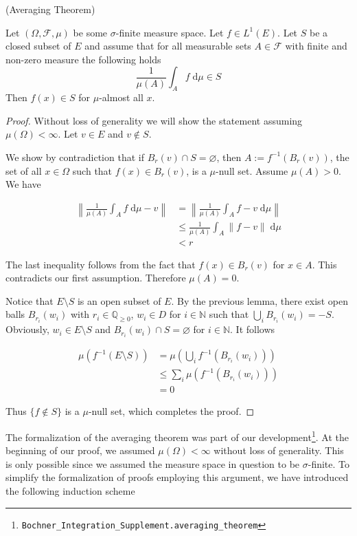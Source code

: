 \begin{theorem}\label{thm:averaging_theorem} (Averaging Theorem) \par
Let $(\Omega, \mathcal{F}, \mu)$ be some $\sigma$-finite measure space. Let $f \in L^1(E)$. Let $S$ be a closed subset of $E$ and assume that for all measurable sets $A \in \mathcal{F}$ with finite and non-zero measure the following holds
\[
	\frac{1}{\mu(A)}\int_A f \;\textrm{d}\mu \in S
\]
Then $f(x) \in S$ for $\mu$-almost all $x$.
\end{theorem}
\begin{proof}
Without loss of generality we will show the statement assuming $\mu(\Omega) < \infty$. Let $v \in E$ and $v \notin S$. 

We show by contradiction that if $B_r(v) \cap S = \varnothing$,  then $A := f^{-1}(B_r(v))$, the set of all $x \in \Omega$ such that $f(x) \in B_r(v)$, is a $\mu$-null set. Assume $\mu(A) > 0$. We have

\begin{align*}
	\left\lVert \frac{1}{\mu(A)}\int_A f \;\textrm{d}\mu  - v \right\rVert &= \left\lVert \frac{1}{\mu(A)}\int_A f - v \;\textrm{d}\mu \right\rVert \\
	&\le \frac{1}{\mu(A)}\int_A \lVert f - v \rVert \;\textrm{d}\mu \\
	&< r
\end{align*}

The last inequality follows from the fact that $f(x) \in B_r(v)$ for $x \in A$. This contradicts our first assumption. Therefore $\mu(A) = 0$.

Notice that $E \setminus S$ is an open subset of $E$. By the previous lemma, there exist open balls $B_{r_i}(w_i)$ with $r_i \in \mathbb{Q}_{\ge 0}$, $w_i \in D$ for $i \in \mathbb{N}$ such that $\bigcup_i B_{r_i}(w_i) = - S$. Obviously, $w_i \in E \setminus S$ and $B_{r_i}(w_i) \cap S = \varnothing$ for $i \in \mathbb{N}$. It follows

\begin{align*}
	\mu(f^{-1}(E \setminus S)) &= \mu\left(\bigcup_i f^{-1}(B_{r_i}(w_i))\right) \\
	&\le \sum_i \mu(f^{-1}(B_{r_i}(w_i))) \\
	&= 0
\end{align*}

Thus $\{f \notin S \}$ is a $\mu$-null set, which completes the proof.

\end{proof}

The formalization of the averaging theorem was part of our development\footnote{\texttt{Bochner\_Integration\_Supplement.averaging\_theorem}}. At the beginning of our proof, we assumed $\mu(\Omega) < \infty$ without loss of generality. This is only possible since we assumed the measure space in question to be $\sigma$-finite. To simplify the formalization of proofs employing this argument, we have introduced the following induction scheme

